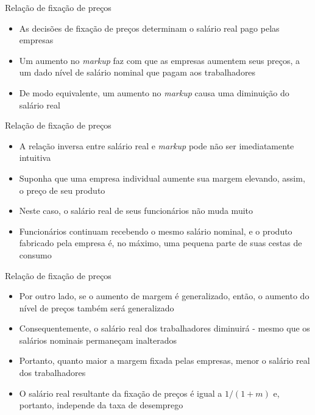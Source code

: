 \documentclass[10pt]{beamer}
\begin{document}
\begin{frame}
    {Relação de fixação de preços}
    \begin{itemize}
        \item As decisões de fixação de preços determinam o salário real pago pelas empresas\bigskip
        \item Um aumento no \emph{markup} faz com que as empresas aumentem seus preços, a um dado nível de salário nominal que pagam aos trabalhadores\bigskip
        \item De modo equivalente, um aumento no \emph{markup} causa uma diminuição do salário real
    \end{itemize}
\end{frame}

\begin{frame}
    {Relação de fixação de preços}
    \begin{itemize}
        \item A relação inversa entre salário real e \emph{markup} pode não ser imediatamente intuitiva\bigskip
        \item Suponha que uma empresa individual aumente sua margem elevando, assim, o preço de seu produto\bigskip
        \item Neste caso, o salário real de seus funcionários não muda muito\bigskip
        \item Funcionários continuam recebendo o mesmo salário nominal, e o produto fabricado pela empresa é, no máximo, uma pequena parte de suas cestas de consumo
    \end{itemize}
\end{frame}

\begin{frame}
    {Relação de fixação de preços}
    \begin{itemize}
        \item Por outro lado, se o aumento de margem é generalizado, então, o aumento do nível de preços também será generalizado\bigskip
        \item Consequentemente, o salário real dos trabalhadores diminuirá - mesmo que os salários nominais permaneçam inalterados\bigskip
        \item Portanto, quanto maior a margem fixada pelas empresas, menor o salário real dos trabalhadores\bigskip
        \item O salário real resultante da fixação de preços é igual a $1/(1 + m)$ e, portanto, independe da taxa de desemprego 
    \end{itemize}
\end{frame}
\end{document}
